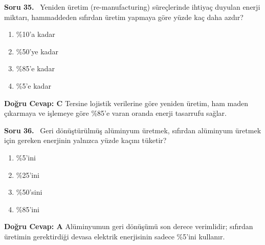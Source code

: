 \documentclass[11pt,a4paper,openany]{book}
\begin{document}
\needspace{5cm}
\vspace{8pt}
\noindent\textbf{\large\sffamily Soru 35.} \ Yeniden üretim (re-manufacturing) süreçlerinde ihtiyaç duyulan enerji miktarı, hammaddeden sıfırdan üretim yapmaya göre yüzde kaç daha azdır?
\begin{enumerate}[label=\Alph*), leftmargin=25pt, topsep=4pt, itemsep=2pt]
    \item \%10'a kadar
    \item \%50'ye kadar
    \item \%85'e kadar
    \item \%5'e kadar
\end{enumerate}
\vspace{4pt}
\begin{tcolorbox}[title=Cevap ve Açıklama, colback=gray!3!white, colframe=primarycolor!90!black, arc=2mm, fonttitle=\bfseries\sffamily, top=6pt, bottom=6pt]
    \textbf{Doğru Cevap: C}
    \vspace{2pt}
    Tersine lojistik verilerine göre yeniden üretim, ham maden çıkarmaya ve işlemeye göre \%85'e varan oranda enerji tasarrufu sağlar.
\end{tcolorbox}
\vspace{10pt}

\needspace{5cm}
\vspace{8pt}
\noindent\textbf{\large\sffamily Soru 36.} \ Geri dönüştürülmüş alüminyum üretmek, sıfırdan alüminyum üretmek için gereken enerjinin yalnızca yüzde kaçını tüketir?
\begin{enumerate}[label=\Alph*), leftmargin=25pt, topsep=4pt, itemsep=2pt]
    \item \%5'ini
    \item \%25'ini
    \item \%50'sini
    \item \%85'ini
\end{enumerate}
\vspace{4pt}
\begin{tcolorbox}[title=Cevap ve Açıklama, colback=gray!3!white, colframe=primarycolor!90!black, arc=2mm, fonttitle=\bfseries\sffamily, top=6pt, bottom=6pt]
    \textbf{Doğru Cevap: A}
    \vspace{2pt}
    Alüminyumun geri dönüşümü son derece verimlidir; sıfırdan üretimin gerektirdiği devasa elektrik enerjisinin sadece \%5'ini kullanır.
\end{tcolorbox}
\vspace{10pt}
\end{document}

